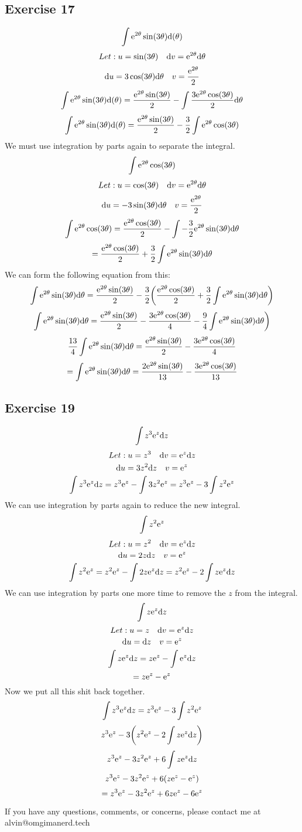 \documentclass[letterpaper, 12pt]{math}
\begin{document}
\subsection*{Exercise 17}
\[ \int{\mathrm{e}^{2\theta}\sin(3\theta)}\mathrm{d}(\theta) \]
\[ Let: u = \sin(3\theta) \quad \mathrm{d}{v} = \mathrm{e}^{2\theta}\mathrm{d}{\theta} \]
\[ \mathrm{d}{u} = 3\cos(3\theta)\mathrm{d}{\theta} \quad v = \frac{\mathrm{e}^{2\theta}}{2} \]
\[ \int{\mathrm{e}^{2\theta}\sin(3\theta)}\mathrm{d}(\theta) =
   \frac{\mathrm{e}^{2\theta}\sin(3\theta)}{2}-
   \int{\frac{3\mathrm{e}^{2\theta}\cos(3\theta)}{2}\mathrm{d}{\theta}} \]
\[ \int{\mathrm{e}^{2\theta}\sin(3\theta)}\mathrm{d}(\theta) =
   \frac{\mathrm{e}^{2\theta}\sin(3\theta)}{2}-
   \frac{3}{2}\int{\mathrm{e}^{2\theta}\cos(3\theta)} \]
We must use integration by parts again to separate the integral.
\[ \int{\mathrm{e}^{2\theta}\cos(3\theta)} \]
\[ Let: u = \cos(3\theta) \quad \mathrm{d}{v} = \mathrm{e}^{2\theta}\mathrm{d}{\theta} \]
\[ \mathrm{d}{u} = -3\sin(3\theta)\mathrm{d}{\theta} \quad v = \frac{\mathrm{e}^{2\theta}}{2} \]
\[ \int{\mathrm{e}^{2\theta}\cos(3\theta)} =
   \frac{\mathrm{e}^{2\theta}\cos(3\theta)}{2}-
   \int{-\frac{3}{2}\mathrm{e}^{2\theta}\sin(3\theta)\mathrm{d}{\theta}} \]
\[ = \frac{\mathrm{e}^{2\theta}\cos(3\theta)}{2}+\frac{3}{2}
   \int{\mathrm{e}^{2\theta}\sin(3\theta)\mathrm{d}{\theta}} \]
We can form the following equation from this:
\[ \int{\mathrm{e}^{2\theta}\sin(3\theta)\mathrm{d}{\theta}} =
   \frac{\mathrm{e}^{2\theta}\sin(3\theta)}{2}-
   \frac{3}{2}\bigg(\frac{\mathrm{e}^{2\theta}\cos(3\theta)}{2}+
   \frac{3}{2}\int{\mathrm{e}^{2\theta}\sin(3\theta)\mathrm{d}{\theta}}\bigg) \]
\[ \int{\mathrm{e}^{2\theta}\sin(3\theta)\mathrm{d}{\theta}} =
   \frac{\mathrm{e}^{2\theta}\sin(3\theta)}{2}-
   \frac{3\mathrm{e}^{2\theta}\cos(3\theta)}{4}-
   \frac{9}{4}\int{\mathrm{e}^{2\theta}\sin(3\theta)\mathrm{d}{\theta}}\bigg) \]
\[ \frac{13}{4}\int{\mathrm{e}^{2\theta}\sin(3\theta)\mathrm{d}{\theta}} =
   \frac{\mathrm{e}^{2\theta}\sin(3\theta)}{2}-
   \frac{3\mathrm{e}^{2\theta}\cos(3\theta)}{4} \]
\[ = \int{\mathrm{e}^{2\theta}\sin(3\theta)\mathrm{d}{\theta}} =
\frac{2\mathrm{e}^{2\theta}\sin(3\theta)}{13}-
\frac{3\mathrm{e}^{2\theta}\cos(3\theta)}{13} \]

\subsection*{Exercise 19}
\[ \int{z^{3}\mathrm{e}^{z}\mathrm{d}{z}} \]
\[ Let: u = z^{3} \quad \mathrm{d}{v} = \mathrm{e}^{z}\mathrm{d}{z} \]
\[ \mathrm{d}{u} = 3z^{2}\mathrm{d}{z} \quad v = \mathrm{e}^{z} \]
\[ \int{z^{3}\mathrm{e}^{z}\mathrm{d}{z}} =
   z^{3}\mathrm{e}^{z}-\int{3z^{2}\mathrm{e}^{z}} =
   z^{3}\mathrm{e}^{z}-3\int{z^{2}\mathrm{e}^{z}} \]
We can use integration by parts again to reduce the new integral.
\[ \int{z^{2}\mathrm{e}^{z}} \]
\[ Let: u = z^{2} \quad \mathrm{d}{v} = \mathrm{e}^{z}\mathrm{d}{z} \]
\[ \mathrm{d}{u} = 2z\mathrm{d}{z} \quad v = \mathrm{e}^{z} \]
\[ \int{z^{2}\mathrm{e}^{z}} = z^{2}\mathrm{e}^{z}-\int{2z\mathrm{e}^{z}\mathrm{d}{z}} =
   z^{2}\mathrm{e}^{z}-2\int{z\mathrm{e}^{z}\mathrm{d}{z}} \]
We can use integration by parts one more time to remove the \( z \) from the
integral.
\[ \int{z\mathrm{e}^{z}\mathrm{d}{z}} \]
\[ Let: u = z \quad \mathrm{d}{v} = \mathrm{e}^{z}\mathrm{d}{z} \]
\[ \mathrm{d}{u} = \mathrm{d}{z} \quad v = \mathrm{e}^{z} \]
\[ \int{z\mathrm{e}^{z}\mathrm{d}{z}} = z\mathrm{e}^{z}-\int{\mathrm{e}^{z}\mathrm{d}{z}} \]
\[ = z\mathrm{e}^{z}-\mathrm{e}^{z} \]
Now we put all this shit back together.
\[ \int{z^{3}\mathrm{e}^{z}\mathrm{d}{z}} =
   z^{3}\mathrm{e}^{z}-3\int{z^{2}\mathrm{e}^{z}} \]
\[ z^{3}\mathrm{e}^{z}-3\bigg(z^{2}\mathrm{e}^{z}-2\int{z\mathrm{e}^{z}\mathrm{d}{z}}\bigg) \]
\[ z^{3}\mathrm{e}^{z}-3z^{2}\mathrm{e}^{z}+6\int{z\mathrm{e}^{z}\mathrm{d}{z}} \]
\[ z^{3}\mathrm{e}^{z}-3z^{2}\mathrm{e}^{z}+6(z\mathrm{e}^{z}-\mathrm{e}^{z}) \]
\[ = z^{3}\mathrm{e}^{z}-3z^{2}\mathrm{e}^{z}+6z\mathrm{e}^{z}-6\mathrm{e}^{z} \]

\begin{center}
  If you have any questions, comments, or concerns, please contact me at
  alvin@omgimanerd.tech
\end{center}
\end{document}
